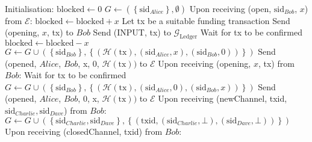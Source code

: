 \ \\ 
  \label{alg:lightningprot}
  \begin{algorithmic}[1]
    \State Initialisation:
      \State $\mathrm{blocked} \leftarrow 0$
      \State $G \leftarrow \left(\left\{\mathrm{sid}_{Alice}\right\}, \emptyset\right)$
    \State
    \State Upon receiving (open, $\mathrm{sid}_{Bob}$, $x$) from $\mathcal{E}$:
        \State $\mathrm{blocked} \leftarrow \mathrm{blocked} + x$
        \State Let tx be a suitable funding transaction
        \State Send (opening, $x$, tx) to $Bob$
        \State Send (INPUT, tx) to $\mathcal{G}_{\mathrm{Ledger}}$
        \State Wait for tx to be confirmed 
        \State $\mathrm{blocked} \leftarrow \mathrm{blocked} - x$
        \State $G \leftarrow G \cup \left(\left\{\mathrm{sid}_{Bob}\right\},
        \left\{\left(\mathcal{H}\left(\mathrm{tx}\right), \left(\mathrm{sid}_{Alice},
        x\right), \left(\mathrm{sid}_{Bob}, 0\right)\right)\right\}\right)$ 
        \State Send (opened, $Alice$, $Bob$, x, 0, $\mathcal{H}\left(\mathrm{tx}\right))$
        to $\mathcal{E}$
      \EndIf
    \State
    \State Upon receiving (opening, $x$, tx) from $Bob$:
      \State Wait for tx to be confirmed
      \State $G \leftarrow G \cup \left(\left\{\mathrm{sid}_{Bob}\right\},
      \left\{\left(\mathcal{H}\left(\mathrm{tx}\right), \left(\mathrm{sid}_{Alice},
      0\right), \left(\mathrm{sid}_{Bob}, x\right)\right)\right\}\right)$ 
      \State Send (opened, $Alice$, $Bob$, 0, x, $\mathcal{H}\left(\mathrm{tx}\right))$ to
      $\mathcal{E}$
    \State
    \State Upon receiving (newChannel, txid, $\mathrm{sid}_{Charlie},
    \mathrm{sid}_{Dave}$) from $Bob$:
        \State $G \leftarrow G \cup \left(\left\{\mathrm{sid}_{Charlie},
        \mathrm{sid}_{Dave}\right\}, \left\{\left(\mathrm{txid},
        \left(\mathrm{sid}_{Charlie}, \bot\right), \left(\mathrm{sid}_{Dave},
        \bot\right)\right)\right\}\right)$ 
      \EndIf
    \State
    \State Upon receiving (closedChannel, txid) from $Bob$:
\end{algorithmic}
